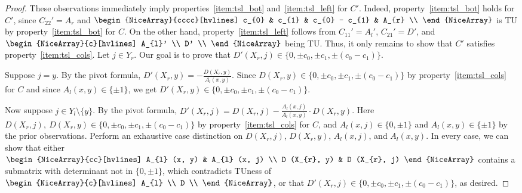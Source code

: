 \begin{proof}
    These observations immediately imply properties~\ref{item:tsl_bot} and~\ref{item:tsl_left} for $C'$. Indeed, property~\ref{item:tsl_bot} holds for $C'$, since $C_{22}' = A_{r}$ and $\begin{NiceArray}{cccc}[hvlines] c_{0} & c_{1} & c_{0} - c_{1} & A_{r} \\ \end{NiceArray}$ is TU by property~\ref{item:tsl_bot} for $C$. On the other hand, property~\ref{item:tsl_left} follows from $C_{11}' = A_{l}'$, $C_{21}' = D'$, and $\begin{NiceArray}{c}[hvlines] A_{l}' \\ D' \\ \end{NiceArray}$ being TU. Thus, it only remains to show that $C'$ satisfies property~\ref{item:tsl_cols}. Let $j \in Y_{r}$. Our goal is to prove that $D' (X_{r}, j) \in \{0, \pm c_{0}, \pm c_{1}, \pm (c_{0} - c_{1})\}$.

    Suppose $j = y$. By the pivot formula, $D' (X_{r}, y) = -\frac{D (X_{r}, y)}{A_{l} (x, y)}$. Since $D (X_{r}, y) \in \{0, \pm c_{0}, \pm c_{1}, \pm (c_{0} - c_{1})\}$ by property~\ref{item:tsl_cols} for $C$ and since $A_{l} (x, y) \in \{\pm 1\}$, we get $D' (X_{r}, y) \in \{0, \pm c_{0}, \pm c_{1}, \pm (c_{0} - c_{1})\}$.

    Now suppose $j \in Y_{l} \setminus \{y\}$. By the pivot formula, $D' (X_{r}, j) = D (X_{r}, j) - \frac{A_{l} (x, j)}{A_{l} (x, y)} \cdot D (X_{r}, y)$. Here $D (X_{r}, j), \ D (X_{r}, y) \in \{0, \pm c_{0}, \pm c_{1}, \pm (c_{0} - c_{1})\}$ by property~\ref{item:tsl_cols} for $C$, and $A_{l} (x, j) \in \{0, \pm 1\}$ and $A_{l} (x, y) \in \{\pm 1\}$ by the prior observations. Perform an exhaustive case distinction on $D (X_{r}, j)$, $D (X_{r}, y)$, $A_{l} (x, j)$, and $A_{l} (x, y)$. In every case, we can show that either $\begin{NiceArray}{cc}[hvlines] A_{l} (x, y) & A_{l} (x, j) \\ D (X_{r}, y) & D (X_{r}, j) \end{NiceArray}$ contains a submatrix with determinant not in $\{0, \pm 1\}$, which contradicts TUness of $\begin{NiceArray}{c}[hvlines] A_{l} \\ D \\ \end{NiceArray}$, or that $D' (X_{r}, j) \in \{0, \pm c_{0}, \pm c_{1}, \pm (c_{0} - c_{1})\}$, as desired.
\end{proof}

